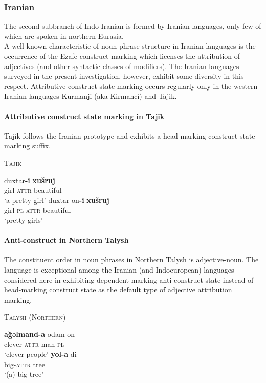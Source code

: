 \subsubsection{Iranian}\label{iranian synchr}
The second subbranch of Indo-Iranian is formed by Iranian languages, only few of which are spoken in northern Eurasia.\\

\noindent A well-known characteristic of noun phrase structure in Iranian languages is the occurrence of the Ezafe construct marking which licenses the attribution of adjectives (and other syntactic classes of modifiers). The Iranian languages surveyed in the present investigation, however, exhibit some diversity in this respect. Attributive construct state marking occurs regularly only in the western Iranian languages Kurmanji (aka Kirmancî) and Tajik.

\paragraph{Attributive construct state marking in Tajik} Tajik follows the Iranian prototype and exhibits a head-marking construct state marking suffix.

\begin{exe}
\ex \textsc{Tajik} \citep{rastorgueva1963}
\begin{xlist}
\ex
\gll	duxtar\textbf{-i} \textbf{xušrūj}\\
	girl-\textsc{attr} beautiful\\
\glt	‘a pretty girl’
\ex
\gll	duxtar-on\textbf{-i} \textbf{xušrūj}\\
	girl-\textsc{pl}-\textsc{attr} beautiful\\
\glt	‘pretty girls’
\end{xlist}
\end{exe}

\paragraph{Anti-construct in Northern Talysh} \label{talysh synchr}
The constituent order in noun phrases in Northern Talysh is adjective-noun. The language is exceptional a\-mong the Iranian (and Indoeuropean) languages considered here in exhibiting dependent marking anti-construct state instead of head-marking construct state as the default type of adjective attribution marking.

\begin{exe}
\ex \textsc{Talysh (Northern)} \cite[27]{schulze2000}%
\begin{xlist}
\ex
\gll	\textbf{āğəlmānd-a} odam-on\\
	clever-\textsc{attr} man-\textsc{pl}\\
\glt	‘clever people’
\ex
\gll	\textbf{yol-a} di\\
	big-\textsc{attr} tree\\
\glt	‘(a) big tree’
\end{xlist}
\end{exe}


